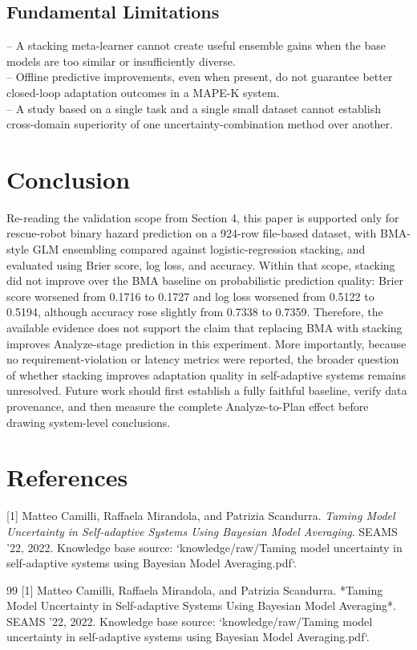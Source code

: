\documentclass[11pt,a4paper]{article}
\begin{document}
\subsection{Fundamental Limitations}
\noindent -- A stacking meta-learner cannot create useful ensemble gains when the base models are too similar or insufficiently diverse.\\
\noindent -- Offline predictive improvements, even when present, do not guarantee better closed-loop adaptation outcomes in a MAPE-K system.\\
\noindent -- A study based on a single task and a single small dataset cannot establish cross-domain superiority of one uncertainty-combination method over another.\\


\section{Conclusion}
Re-reading the validation scope from Section 4, this paper is supported only for rescue-robot binary hazard prediction on a 924-row file-based dataset, with BMA-style GLM ensembling compared against logistic-regression stacking, and evaluated using Brier score, log loss, and accuracy. Within that scope, stacking did not improve over the BMA baseline on probabilistic prediction quality: Brier score worsened from 0.1716 to 0.1727 and log loss worsened from 0.5122 to 0.5194, although accuracy rose slightly from 0.7338 to 0.7359. Therefore, the available evidence does not support the claim that replacing BMA with stacking improves Analyze-stage prediction in this experiment. More importantly, because no requirement-violation or latency metrics were reported, the broader question of whether stacking improves adaptation quality in self-adaptive systems remains unresolved. Future work should first establish a fully faithful baseline, verify data provenance, and then measure the complete Analyze-to-Plan effect before drawing system-level conclusions.


\section{References}
[1] Matteo Camilli, Raffaela Mirandola, and Patrizia Scandurra. \textit{Taming Model Uncertainty in Self-adaptive Systems Using Bayesian Model Averaging}. SEAMS '22, 2022. Knowledge base source: `knowledge/raw/Taming model uncertainty in self-adaptive systems using Bayesian Model Averaging.pdf`.

\begin{thebibliography}{99}
 [1] Matteo Camilli, Raffaela Mirandola, and Patrizia Scandurra. *Taming Model Uncertainty in Self-adaptive Systems Using Bayesian Model Averaging*. SEAMS '22, 2022. Knowledge base source: `knowledge/raw/Taming model uncertainty in self-adaptive systems using Bayesian Model Averaging.pdf`.
\end{thebibliography}
\end{document}
